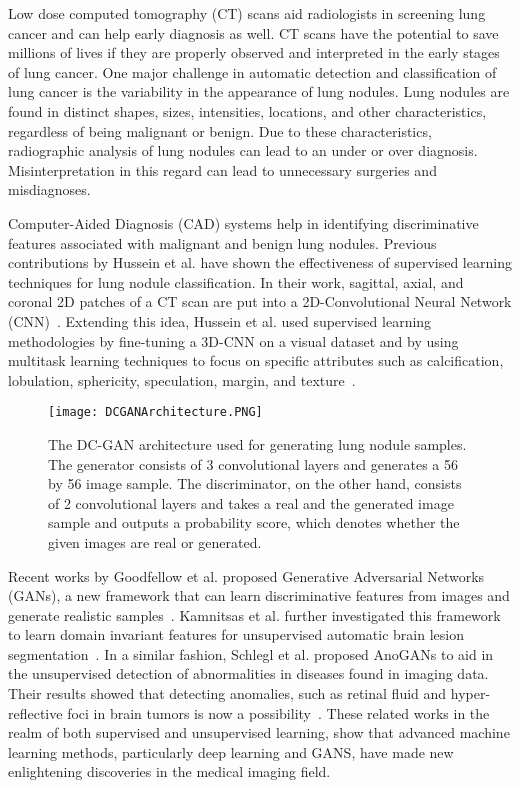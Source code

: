 \documentclass{article}
\begin{document}
Low dose computed tomography (CT) scans aid radiologists in screening lung cancer and can help early diagnosis as well. CT scans have the potential to save millions of lives if they are properly observed and interpreted in the early stages of lung cancer. One major challenge in automatic detection and classification of lung cancer is the variability in the appearance of lung nodules. Lung nodules are found in distinct shapes, sizes, intensities, locations, and other characteristics, regardless of being malignant or benign. Due to these characteristics, radiographic analysis of lung nodules can lead to an under or over diagnosis. Misinterpretation in this regard can lead to unnecessary surgeries and misdiagnoses. 
   
Computer-Aided Diagnosis (CAD) systems help in identifying discriminative features associated with malignant and benign lung nodules. Previous contributions by Hussein et al. have shown the effectiveness of supervised learning techniques for lung nodule classification. In their work, sagittal, axial, and coronal 2D patches of a CT scan are put into a 2D-Convolutional Neural Network (CNN)~\cite{hussein2017tumornet}. Extending this idea, Hussein et al. used supervised learning methodologies by fine-tuning a 3D-CNN on a visual dataset and by using multitask learning techniques to focus on specific attributes such as calcification, lobulation, sphericity, speculation, margin, and texture~\cite{hussein2017riskstratification}.
   

\begin{figure*}[t]
\centering
    \texttt{[image: DCGANArchitecture.PNG]}
	\caption{The DC-GAN architecture used for generating lung nodule samples. The generator consists of 3 convolutional layers and generates a 56 by 56 image sample. The discriminator, on the other hand, consists of 2 convolutional layers and takes a real and the generated image sample and outputs a probability score, which denotes whether the given images are real or generated.}
    \label{fig:DC-GAN}
\end{figure*}  

Recent works by Goodfellow et al. proposed Generative Adversarial Networks (GANs), a new framework that can learn discriminative features from images and generate realistic samples~\cite{IanGans}. Kamnitsas et al. further investigated this framework to learn domain invariant features for unsupervised automatic brain lesion segmentation~\cite{KonstaBrainLesions}. In a similar fashion, Schlegl et al. proposed AnoGANs to aid in the unsupervised detection of abnormalities in diseases found in imaging data. Their results showed that detecting anomalies, such as retinal fluid and hyper-reflective foci in brain tumors is now a possibility~\cite{SchleglUnsupervisedAnomaly}. These related works in the realm of both supervised and unsupervised learning, show that advanced machine learning methods, particularly deep learning and GANS, have made new enlightening discoveries in the medical imaging field. 
\end{document}

